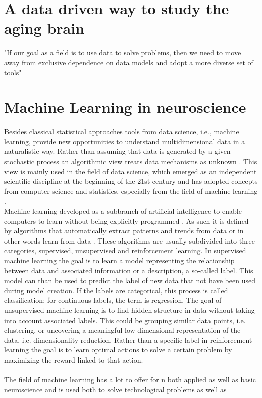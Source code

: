 \section{A data driven way to study the aging brain}

"If our goal as a field is to use data to solve problems, then we need to move away from exclusive dependence on data models and adopt a more diverse set of tools" \cite{Breiman2001}

\section{Machine Learning in neuroscience} 
Besides classical statistical approaches tools from data science, i.e., machine learning, provide new opportunities to understand multidimensional data in a naturalistic way. Rather than assuming that data is generated by a given stochastic process an algorithmic view treats data mechanisms as unknown \cite{Breiman2001}. This view is mainly used in the field of data science, which emerged as an independent scientific discipline at the beginning of the 21st century and has adopted concepts from computer science and statistics, especially from the field of machine learning \cite{Nylen2013}.\\
Machine learning developed as a subbranch of artificial intelligence to enable computers to learn without being explicitly programmed \cite{Samual1959}. As such it is defined by algorithms that automatically extract patterns and trends from data or in other words learn from data \cite{Hastie2009}. These algorithms are usually subdivided into three categories, supervised, unsupervised and reinforcement learning. In supervised machine learning the goal is to learn a model representing the relationship between data and associated information or a description, a so-called label. This model can than be used to predict the label of new data that not have been used during model creation. If the labels are categorical, this process is called classification; for continuous labels, the term is regression. The goal of unsupervised machine learning is to find hidden structure in data without taking into account associated labels. This could be grouping similar data points, i.e. clustering, or uncovering a meaningful low dimensional representation of the data, i.e. dimensionality reduction. Rather than a specific label in reinforcement learning the goal is to learn optimal actions to solve a certain problem by maximizing the reward linked to that action.\\
\\
The field of machine learning has a lot to offer for n both applied as well as basic neuroscience and is used both to solve technological problems as well as  

